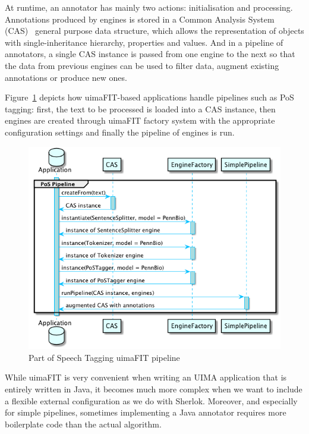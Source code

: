 \documentclass{article}
\newcommand{\ID}[1]{{\textsc{#1}}}
\begin{document}
At runtime, an annotator has mainly two actions: initialisation and processing. Annotations produced
by engines is stored in a Common Analysis System (CAS)~\cite{cas} general purpose data structure,
which allows the representation of objects with single-inheritance hierarchy, properties and values.
And in a pipeline of annotators, a single CAS instance is passed from one engine to the next so that
the data from previous engines can be used to filter data, augment existing annotations or produce
new ones.

Figure~\ref{fig:pos_pipeline_uimafit} depicts how uimaFIT-based applications handle pipelines such
as PoS tagging: first, the text to be processed is loaded into a CAS instance, then engines are
created through uimaFIT factory system with the appropriate configuration settings and finally the
pipeline of engines is run.

\begin{figure}[h]
    \centering
    \includegraphics[width=0.9\linewidth]{res/uimafit.png}
    \caption{Part of Speech Tagging uimaFIT pipeline}
    \label{fig:pos_pipeline_uimafit}
\end{figure}


While uimaFIT is very convenient when writing an UIMA application that is entirely written in Java,
it becomes much more complex when we want to include a flexible external configuration as we do with
Sherlok. Moreover, and especially for simple pipelines, sometimes implementing a Java annotator
requires more boilerplate code than the actual algorithm.
\end{document}

